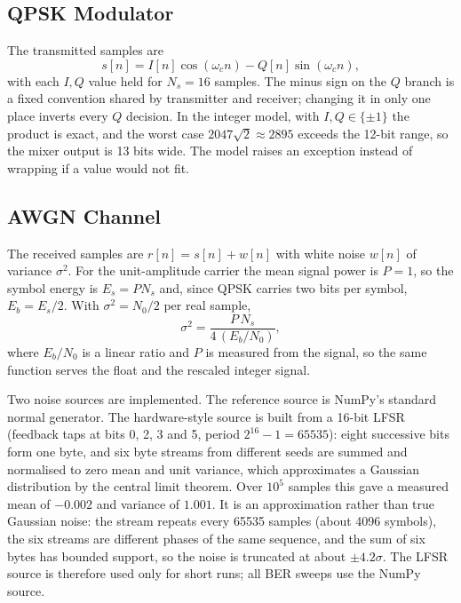 \documentclass[10pt,twocolumn,letterpaper]{article}
\begin{document}
\subsection{QPSK Modulator}

The transmitted samples are
\begin{equation}
s[n] = I[n]\cos(\omega_c n) - Q[n]\sin(\omega_c n),
\end{equation}
with each $I,Q$ value held for $N_s=16$ samples. The minus sign on the
$Q$ branch is a fixed convention shared by transmitter and receiver; changing
it in only one place inverts every $Q$ decision. In the integer model, with
$I,Q\in\{\pm1\}$ the product is exact, and the worst case
$2047\sqrt2\approx 2895$ exceeds the 12-bit range, so the mixer output is
13 bits wide. The model raises an exception instead of wrapping if a value
would not fit.

\subsection{AWGN Channel}

The received samples are $r[n]=s[n]+w[n]$ with white noise $w[n]$ of
variance $\sigma^2$. For the unit-amplitude carrier the mean signal power is
$P=1$, so the symbol energy is $E_s=PN_s$ and, since QPSK carries two bits
per symbol, $E_b=E_s/2$. With $\sigma^2=N_0/2$ per real sample,
\begin{equation}
\sigma^2=\frac{P\,N_s}{4\,(E_b/N_0)} ,
\end{equation}
where $E_b/N_0$ is a linear ratio and $P$ is measured from the signal, so the
same function serves the float and the rescaled integer signal.

Two noise sources are implemented. The reference source is NumPy's standard
normal generator. The hardware-style source is built from a 16-bit LFSR
(feedback taps at bits 0, 2, 3 and 5, period $2^{16}-1=65535$): eight
successive bits form one byte, and six byte streams from different seeds are
summed and normalised to zero mean and unit variance, which approximates a
Gaussian distribution by the central limit theorem. Over $10^5$ samples this
gave a measured mean of $-0.002$ and variance of $1.001$. It is an
approximation rather than true Gaussian noise: the stream repeats every 65535
samples (about 4096 symbols), the six streams are different phases of the same
sequence, and the sum of six bytes has bounded support, so the noise is
truncated at about $\pm4.2\sigma$. The LFSR source is therefore used only for
short runs; all BER sweeps use the NumPy source.
\end{document}
